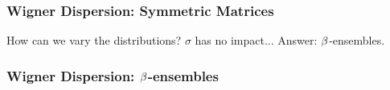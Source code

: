 
\begin{frame} \frametitle{Wigner Dispersion: Symmetric Matrices}

How can we vary the distributions? $\sigma$ has no impact...
Answer: $\beta$-ensembles.

\end{frame}


\begin{frame} \frametitle{Wigner Dispersion: $\beta$-ensembles}


\end{frame}

